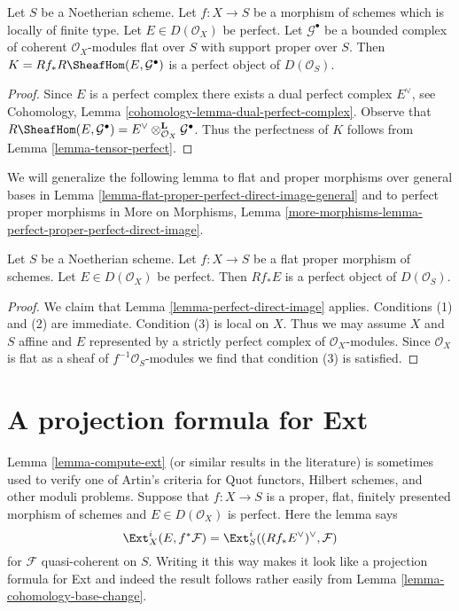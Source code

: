 \begin{lemma}
\label{lemma-ext-perfect}
Let $S$ be a Noetherian scheme. Let $f : X \to S$ be a morphism of schemes
which is locally of finite type. Let $E \in D(\mathcal{O}_X)$ be perfect.
Let $\mathcal{G}^\bullet$ be a bounded complex of coherent
$\mathcal{O}_X$-modules flat over $S$ with support proper over $S$.
Then $K = Rf_*R\SheafHom(E, \mathcal{G}^\bullet)$ is a perfect object of
$D(\mathcal{O}_S)$.
\end{lemma}

\begin{proof}
Since $E$ is a perfect complex there exists a dual perfect complex
$E^\vee$, see Cohomology, Lemma \ref{cohomology-lemma-dual-perfect-complex}.
Observe that $R\SheafHom(E, \mathcal{G}^\bullet) =
E^\vee \otimes^\mathbf{L}_{\mathcal{O}_X} \mathcal{G}^\bullet$.
Thus the perfectness of $K$ follows from Lemma \ref{lemma-tensor-perfect}.
\end{proof}

\noindent
We will generalize the following lemma to flat and proper morphisms
over general bases in
Lemma \ref{lemma-flat-proper-perfect-direct-image-general}
and to perfect proper morphisms in
More on Morphisms, Lemma
\ref{more-morphisms-lemma-perfect-proper-perfect-direct-image}.

\begin{lemma}
\label{lemma-flat-proper-perfect-direct-image}
Let $S$ be a Noetherian scheme. Let $f : X \to S$ be a flat proper
morphism of schemes. Let $E \in D(\mathcal{O}_X)$ be perfect. Then
$Rf_*E$ is a perfect object of $D(\mathcal{O}_S)$.
\end{lemma}

\begin{proof}
We claim that Lemma \ref{lemma-perfect-direct-image} applies.
Conditions (1) and (2) are immediate. Condition (3) is local
on $X$. Thus we may assume $X$ and $S$ affine and $E$
represented by a strictly perfect complex of $\mathcal{O}_X$-modules.
Since $\mathcal{O}_X$ is flat as a sheaf of $f^{-1}\mathcal{O}_S$-modules
we find that condition (3) is satisfied.
\end{proof}






\section{A projection formula for Ext}
\label{section-ext}

\noindent
Lemma \ref{lemma-compute-ext} (or similar results in the literature)
is sometimes used to verify one of Artin's criteria for
Quot functors, Hilbert schemes, and other moduli problems.
Suppose that $f : X \to S$ is a proper, flat, finitely presented
morphism of schemes and $E \in D(\mathcal{O}_X)$ is perfect.
Here the lemma says
$$
\Ext^i_X(E, f^*\mathcal{F}) =
\Ext^i_S((Rf_*E^\vee)^\vee, \mathcal{F})
$$
for $\mathcal{F}$ quasi-coherent on $S$.
Writing it this way makes it look like a projection formula
for Ext and indeed the result follows rather
easily from Lemma \ref{lemma-cohomology-base-change}.

